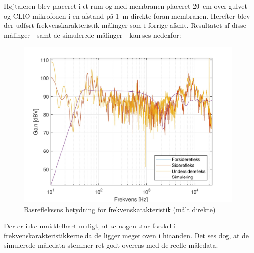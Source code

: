 \newpage
Højtaleren blev placeret i et rum og med membranen placeret \SI{20}{\centi\meter} over gulvet og CLIO-mikrofonen i en afstand på \SI{1}{\meter} direkte foran membranen. Herefter blev der udført frekvenskarakteristik-målinger som i forrige afsnit. Resultatet af disse målinger - samt de simulerede målinger - kan ses nedenfor:
\begin{figure}[H]
	\centering
	\vspace{-12pt}
	\includegraphics[width=\textwidth]{Billeder/Grafer/RealDirect}
	\caption{Basrefleksens betydning for frekvenskarakteristik (målt direkte)}
\end{figure}

Der er ikke umiddelbart muligt, at se nogen stor forskel i frekvenskarakteristikkerne da de ligger meget oven i hinanden. Det ses dog, at de simulerede måledata stemmer ret godt overens med de reelle måledata.

